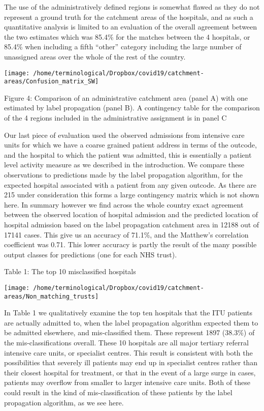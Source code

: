\documentclass[
]{article}
\begin{document}
The use of the administratively defined regions is somewhat flawed as
they do not represent a ground truth for the catchment areas of the
hospitals, and as such a quantitative analysis is limited to an
evaluation of the overall agreement between the two estimates which was
85.4\% for the matches between the 4 hospitals, or 85.4\% when including
a fifth ``other'' category including the large number of unassigned
areas over the whole of the rest of the country.

\begin{center}\texttt{[image: /home/terminological/Dropbox/covid19/catchment-areas/Confusion\_matrix\_SW]} \end{center}

Figure 4: Comparison of an administrative catchment area (panel A) with
one estimated by label propagation (panel B). A contingency table for
the comparison of the 4 regions included in the administrative
assignment is in panel C

Our last piece of evaluation used the observed admissions from intensive
care units for which we have a coarse grained patient address in terms
of the outcode, and the hospital to which the patient was admitted, this
is essentially a patient level activity measure as we described in the
introduction. We compare these observations to predictions made by the
label propagation algorithm, for the expected hospital associated with a
patient from any given outcode. As there are 215 under consideration
this forms a large contingency matrix which is not shown here. In
summary however we find across the whole country exact agreement between
the observed location of hospital admission and the predicted location
of hospital admission based on the label propagation catchment area in
12188 out of 17141 cases. This give us an accuracy of 71.1\%, and the
Matthew's correlation coefficient was 0.71. This lower accuracy is
partly the result of the many possible output classes for predictions
(one for each NHS trust).

Table 1: The top 10 misclassified hospitals

\begin{center}\texttt{[image: /home/terminological/Dropbox/covid19/catchment-areas/Non\_matching\_trusts]} \end{center}

In Table 1 we qualitatively examine the top ten hospitals that the ITU
patients are actually admitted to, when the label propagation algorithm
expected them to be admitted elsewhere, and mis-classified them. These
represent 1897 (38.3\%) of the mis-classifications overall. These 10
hospitals are all major tertiary referral intensive care units, or
specialist centres. This result is consistent with both the
possibilities that severely ill patients may end up in specialist
centres rather than their closest hospital for treatment, or that in the
event of a large surge in cases, patients may overflow from smaller to
larger intensive care units. Both of these could result in the kind of
mis-classification of these patients by the label propagation algorithm,
as we see here.
\end{document}
